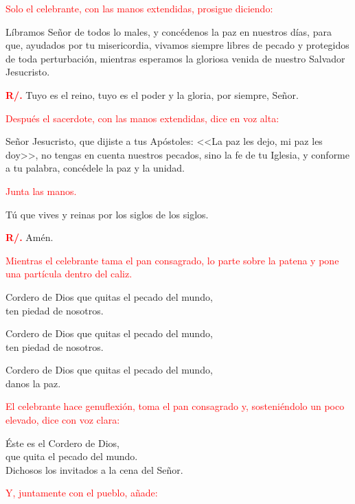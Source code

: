 \documentclass[12pt, letterpaper]{report}
\begin{document}
\large{\textcolor{red}{Solo el celebrante, con las manos extendidas, prosigue diciendo:}}

\noindent
\Large L\'ibramos Se\~nor de todos lo males, y conc\'edenos la paz en nuestros d\'ias, para que, ayudados por tu misericordia, vivamos siempre libres de pecado y protegidos de toda perturbaci\'on, mientras esperamos la gloriosa venida de nuestro Salvador Jesucristo.

\noindent
\Large {\bfseries \textcolor{red}{R/.}} \hspace{0.5cm} Tuyo es el reino, tuyo es el poder y la gloria, por siempre, Se\~nor.

\large{\textcolor{red}{Despu\'es el sacerdote, con las manos extendidas, dice en voz alta:}}

\noindent
\Large Se\~nor Jesucristo, que dijiste a tus Ap\'ostoles: <<La paz les dejo, mi paz les doy>>, no tengas en cuenta nuestros pecados, sino la fe de tu Iglesia, y conforme a tu palabra, conc\'edele la paz y la unidad.

\large{\textcolor{red}{Junta las manos.}}

\noindent
\Large T\'u que vives y reinas por los siglos de los siglos.

\Large {\bfseries \textcolor{red}{R/.}} \hspace{0.5cm} Am\'en.

\large{\textcolor{red}{Mientras el celebrante tama el pan consagrado, lo parte sobre la patena y pone una part\'icula dentro del caliz.}}

\noindent
\Large Cordero de Dios que quitas el pecado del mundo,\\
ten piedad de nosotros.

\noindent
\Large Cordero de Dios que quitas el pecado del mundo,\\ 
ten piedad de nosotros.

\noindent
\Large Cordero de Dios que quitas el pecado del mundo,\\ 
danos la paz.

\large{\textcolor{red}{El celebrante hace genuflexi\'on, toma el pan consagrado y, sosteni\'endolo un poco elevado, dice con voz clara:}}

\noindent
\Large \'Este es el Cordero de Dios,\\ 
que quita el pecado del mundo.\\ 
Dichosos los invitados a la cena del Se\~nor.

\large{\textcolor{red}{Y, juntamente con el pueblo, a\~nade:}}
\end{document}
